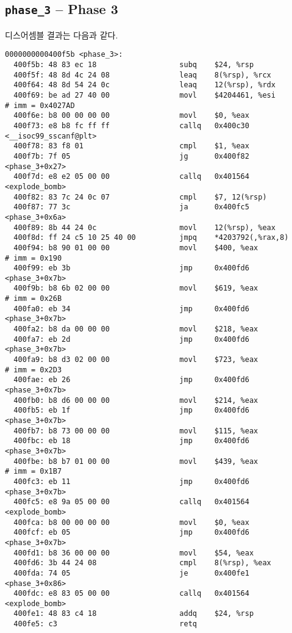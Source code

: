 \documentclass{scrartcl}
\begin{document}
\subsection{\texttt{phase\_3} -- Phase 3}
디스어셈블 결과는 다음과 같다.
\begin{lstlisting}
0000000000400f5b <phase_3>:
  400f5b: 48 83 ec 18                   subq    $24, %rsp
  400f5f: 48 8d 4c 24 08                leaq    8(%rsp), %rcx
  400f64: 48 8d 54 24 0c                leaq    12(%rsp), %rdx
  400f69: be ad 27 40 00                movl    $4204461, %esi          # imm = 0x4027AD
  400f6e: b8 00 00 00 00                movl    $0, %eax
  400f73: e8 b8 fc ff ff                callq   0x400c30 <__isoc99_sscanf@plt>
  400f78: 83 f8 01                      cmpl    $1, %eax
  400f7b: 7f 05                         jg      0x400f82 <phase_3+0x27>
  400f7d: e8 e2 05 00 00                callq   0x401564 <explode_bomb>
  400f82: 83 7c 24 0c 07                cmpl    $7, 12(%rsp)
  400f87: 77 3c                         ja      0x400fc5 <phase_3+0x6a>
  400f89: 8b 44 24 0c                   movl    12(%rsp), %eax
  400f8d: ff 24 c5 10 25 40 00          jmpq    *4203792(,%rax,8)
  400f94: b8 90 01 00 00                movl    $400, %eax              # imm = 0x190
  400f99: eb 3b                         jmp     0x400fd6 <phase_3+0x7b>
  400f9b: b8 6b 02 00 00                movl    $619, %eax              # imm = 0x26B
  400fa0: eb 34                         jmp     0x400fd6 <phase_3+0x7b>
  400fa2: b8 da 00 00 00                movl    $218, %eax
  400fa7: eb 2d                         jmp     0x400fd6 <phase_3+0x7b>
  400fa9: b8 d3 02 00 00                movl    $723, %eax              # imm = 0x2D3
  400fae: eb 26                         jmp     0x400fd6 <phase_3+0x7b>
  400fb0: b8 d6 00 00 00                movl    $214, %eax
  400fb5: eb 1f                         jmp     0x400fd6 <phase_3+0x7b>
  400fb7: b8 73 00 00 00                movl    $115, %eax
  400fbc: eb 18                         jmp     0x400fd6 <phase_3+0x7b>
  400fbe: b8 b7 01 00 00                movl    $439, %eax              # imm = 0x1B7
  400fc3: eb 11                         jmp     0x400fd6 <phase_3+0x7b>
  400fc5: e8 9a 05 00 00                callq   0x401564 <explode_bomb>
  400fca: b8 00 00 00 00                movl    $0, %eax
  400fcf: eb 05                         jmp     0x400fd6 <phase_3+0x7b>
  400fd1: b8 36 00 00 00                movl    $54, %eax
  400fd6: 3b 44 24 08                   cmpl    8(%rsp), %eax
  400fda: 74 05                         je      0x400fe1 <phase_3+0x86>
  400fdc: e8 83 05 00 00                callq   0x401564 <explode_bomb>
  400fe1: 48 83 c4 18                   addq    $24, %rsp
  400fe5: c3                            retq
\end{lstlisting}
\end{document}
